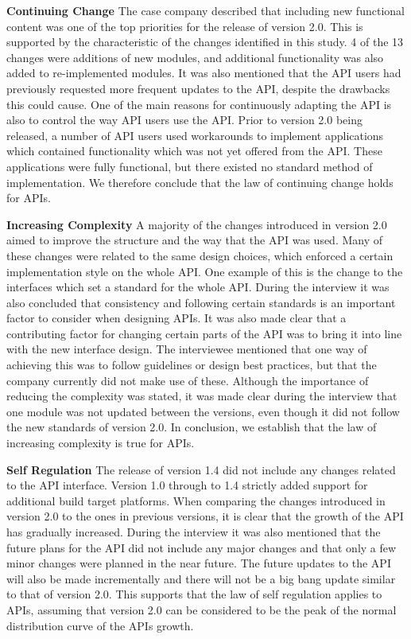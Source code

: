 \documentclass{sig-alternate}
\begin{document}
\smallskip \noindent
\textbf{Continuing Change  } 
The case company described that including new functional content was one of the top priorities for the release of version 2.0. This is supported by the characteristic of the changes identified in this study. 4 of the 13 changes were additions of new modules, and additional functionality was also added to re-implemented modules. It was also mentioned that the API users had previously requested more frequent updates to the API, despite the drawbacks this could cause. One of the main reasons for continuously adapting the API is also to control the way API users use the API. Prior to version 2.0 being released, a number of API users used workarounds to implement applications which contained functionality which was not yet offered from the API. These applications were fully functional, but there existed no standard method of implementation. We therefore conclude that the law of continuing change holds for APIs. 

\smallskip \noindent
\textbf{Increasing Complexity  } \label{sec:law2} 
A majority of the changes introduced in version 2.0 aimed to improve the structure and the way that the API was used. Many of these changes were related to the same design choices, which enforced a certain implementation style on the whole API. One example of this is the change to the interfaces which set a standard for the whole API. During the interview it was also concluded that consistency and following certain standards is an important factor to consider when designing APIs. It was also made clear that a contributing factor for changing certain parts of the API was to bring it into line with the new interface design. The interviewee mentioned that one way of achieving this was to follow guidelines or design best practices, but that the company currently did not make use of these. Although the importance of reducing the complexity was stated, it was made clear during the interview that one module was not updated between the versions, even though it did not follow the new standards of version 2.0. In conclusion, we establish that the law of increasing complexity is true for APIs. 

\smallskip \noindent
\textbf{Self Regulation  } \label{sec:law3} 
The release of version 1.4 did not include any changes related to the API interface. Version 1.0 through to 1.4 strictly added support for additional build target platforms. When comparing the changes introduced in version 2.0 to the ones in previous versions, it is clear that the growth of the API has gradually increased. During the interview it was also mentioned that the future plans for the API did not include any major changes and that only a few minor changes were planned in the near future. The future updates to the API will also be made incrementally and there will not be a big bang update similar to that of version 2.0. This supports that the law of self regulation applies to APIs, assuming that version 2.0 can be considered to be the peak of the normal distribution curve of the APIs growth. 
\end{document}
